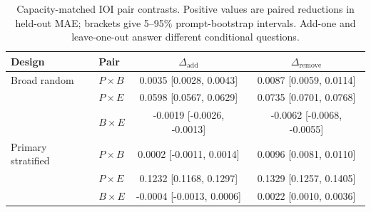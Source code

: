 \begin{table}[H]
\centering
\scriptsize
\begin{tabular}{@{}llcc@{}}
\toprule
Design & Pair & $\Delta_{\mathrm{add}}$ & $\Delta_{\mathrm{remove}}$ \\
\midrule
Broad random & $P\times B$ & 0.0035 [0.0028, 0.0043] & 0.0087 [0.0059, 0.0114] \\
 & $P\times E$ & 0.0598 [0.0567, 0.0629] & 0.0735 [0.0701, 0.0768] \\
 & $B\times E$ & -0.0019 [-0.0026, -0.0013] & -0.0062 [-0.0068, -0.0055] \\
\addlinespace
Primary stratified & $P\times B$ & 0.0002 [-0.0011, 0.0014] & 0.0096 [0.0081, 0.0110] \\
 & $P\times E$ & 0.1232 [0.1168, 0.1297] & 0.1329 [0.1257, 0.1405] \\
 & $B\times E$ & -0.0004 [-0.0013, 0.0006] & 0.0022 [0.0010, 0.0036] \\
\bottomrule
\end{tabular}
\caption{Capacity-matched IOI pair contrasts. Positive values are paired reductions in held-out MAE; brackets give 5--95\% prompt-bootstrap intervals. Add-one and leave-one-out answer different conditional questions.}
\label{tab:ioi-capacity}
\end{table}

